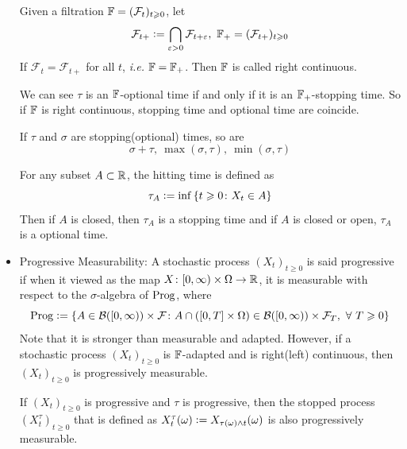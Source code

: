 \documentclass[a4paper,12pt]{article}
\begin{document}
\begin{itemize}
  \noindent Given a filtration $\mathbb{F} =(\mathcal{F}_t)_{t\geqslant 0}$, let
  \begin{equation*}
    \mathcal{F}_{t+} \vcentcolon= \bigcap_{\varepsilon > 0} \mathcal{F}_{t+\varepsilon},~\mathbb{F}_+ =(\mathcal{F}_{t+})_{t\geqslant 0}
  \end{equation*}
  If $\mathcal{F}_t = \mathcal{F}_{t+}$ for all $t$, \emph{i.e.} $\mathbb{F}=\mathbb{F}_+$. Then $\mathbb{F}$ is called right continuous. 

  \noindent We can see $\tau$ is an $\mathbb{F}$-optional time if and only if it is an $\mathbb{F}_+$-stopping time. So if $\mathbb{F}$ is right continuous, stopping time and optional time are coincide.

  \noindent If $\tau$ and $\sigma$ are stopping(optional) times, so are 
  \begin{equation*}
    \sigma + \tau,~\max(\sigma,\tau),~\min(\sigma,\tau)
  \end{equation*}

  \noindent For any subset $A \subset \mathbb{R}$, the hitting time is defined as
  \begin{equation*}
    \tau_A \vcentcolon= \inf\left\{t\geqslant 0 \colon X_t \in A\right\}
  \end{equation*}
  Then if $A$ is closed, then $\tau_A$ is a stopping time and if $A$ is closed or open, $\tau_A$ is a optional time.

  \item Progressive Measurability: A stochastic process $(X_t)_{t\geqslant 0}$ is said progressive if when it viewed as the map $X \colon [0,\infty) \times \Omega \rightarrow \mathbb{R}$, it is measurable with respect to the $\sigma$-algebra of $\operatorname{Prog}$, where
  \begin{equation*}
    \operatorname{Prog} \vcentcolon= \left\{A \in \mathcal{B}([0,\infty))\times\mathcal{F} \colon A \cap ([0,T]\times \Omega) \in \mathcal{B}([0,\infty))\times\mathcal{F}_T,~\forall~T\geqslant 0\right\}
  \end{equation*}
  Note that it is stronger than measurable and adapted. However, if a stochastic process $(X_t)_{t\geqslant 0}$ is $\mathbb{F}$-adapted and is right(left) continuous, then $(X_t)_{t\geqslant 0}$ is progressively measurable.

  \noindent If $(X_t)_{t\geqslant 0}$ is progressive and $\tau$ is progressive, then the stopped process $(X_t^{\tau})_{t\geqslant 0}$ that is defined as $X_t^{\tau}(\omega) \vcentcolon= X_{\tau(\omega) \wedge t}(\omega)$ is also progressively measurable.


\end{itemize}
\end{document}
